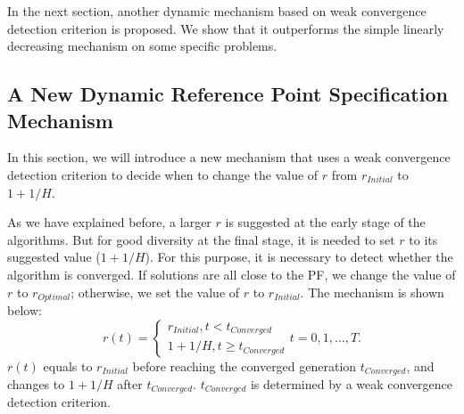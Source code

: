 \documentclass[conference]{IEEEtran}
\begin{document}
In the next section, another dynamic mechanism based on weak convergence detection criterion is proposed. 
We show that it outperforms the simple linearly decreasing mechanism on some specific problems. 

% 
\subsection{A New Dynamic Reference Point Specification Mechanism}
In this section,
we will introduce a new mechanism that uses a weak convergence detection criterion to 
decide when to change the value of $r$ from $r_{Initial}$ to $1+1/H$. 

As we have explained before, 
a larger $r$ is suggested at the early stage of the algorithms. 
But for good diversity at the final stage,
it is needed to set $r$ to its suggested value ($1+1/H$). 
For this purpose, it is necessary to detect whether the algorithm is converged. 
If solutions are all close to the PF, 
we change the value of $r$ to $r_{Optimal}$; otherwise, we set the value of $r$ to 
$r_{Initial}$. The mechanism is shown below:
\begin{equation}\label{endm1}
  r(t)=
  \begin{cases}
    r_{Initial}, t<t_{Converged}\\
    1+1/H, t \ge t_{Converged} 
  \end{cases}
  t=0,1,\dots,T.
\end{equation}
$r(t)$ equals to $r_{Initial}$ before reaching the converged generation $t_{Converged}$, 
and changes to $1+1/H$ after $t_{Converged}$. 
$t_{Converged}$ is determined by a weak convergence detection criterion. 
\end{document}

